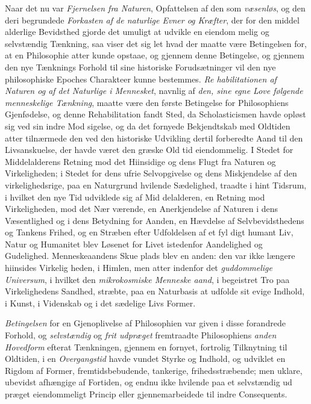 Naar det nu var \emph{Fjernelsen fra Naturen}, Opfattelsen
af den som \emph{væsenløs}, og den deri begrundede \emph{Forkasten
af de naturlige Evner og Kræfter}, der for den middel\-%
alderlige Bevidsthed gjorde det umuligt at udvikle en eiendom\-%
melig og selvstændig Tænkning, saa viser det sig let hvad der
maatte være Betingelsen for, at en Philosophie atter kunde
opstaae, og gjennem denne Betingelse, og gjennem den nye
Tænknings Forhold til sine historiske Forudsætninger vil den
nye philosophiske Epoches Charakteer kunne bestemmes. \emph{Re\-%
habilitationen af Naturen og af det Naturlige i
Mennesket}, navnlig af \emph{den, sine egne Love følgende
menneskelige Tænkning}, maatte være den første Betingelse
for Philosophiens Gjenfødelse, og denne Rehabilitation fandt
Sted, da Scholasticismen havde opløst sig ved sin indre Mod\-%
sigelse, og da det fornyede Bekjendtskab med Oldtiden atter
tilnærmede den ved den historiske Udvikling dertil forberedte
Aand til den Livsanskuelse, der havde været den græske Old\-%
tid eiendommelig. I Stedet for Middelalderens Retning mod
 det Hiinsidige og dens Flugt fra Naturen og Virkeligheden; i
Stedet for dens ufrie Selvopgivelse og dens Miskjendelse af den
virkelighedsrige, paa en Naturgrund hvilende Sædelighed, traadte
i hint Tidsrum, i hvilket den nye Tid udviklede sig af Mid\-%
delalderen, en Retning mod Virkeligheden, mod det Nær\-%
værende, en Anerkjendelse af Naturen i dens Væsentlighed og
i dens Betydning for Aanden, en Hævdelse af Selvbevidsthedens
og Tankens Frihed, og en Stræben efter Udfoldelsen af et fyl\-%
digt humant Liv, Natur og Humanitet blev Løsenet for Livet
istedenfor Aandelighed og Gudelighed. Menneskeaandens Skue\-%
plads blev en anden: den var ikke længere hiinsides Virkelig\-%
heden, i Himlen, men atter indenfor det \emph{guddommelige
Universum}, i hvilket den \emph{mikrokosmiske Menneske\-%
aand}, i begeistret Tro paa Virkelighedens Sandhed, stræbte,
paa en Naturbasis at udfolde sit evige Indhold, i Kunst, i
Videnskab og i det sædelige Livs Former.

\emph{Betingelsen} for en Gjenoplivelse af Philosophien var
given i disse forandrede Forhold, og \emph{selvstændig} og \emph{frit
udpræget} fremtraadte Philosophiens \emph{anden Hovedform}
efterat Tænkningen, gjennem en fornyet, fortrolig Tilknytning
til Oldtiden, i en \emph{Overgangstid} havde vundet Styrke og
Indhold, og udviklet en Rigdom af Former, fremtidsbebudende,
tankerige, frihedsstræbende; men uklare, ubevidst afhængige
af Fortiden, og endnu ikke hvilende paa et selvstændig ud\-%
præget eiendommeligt Princip eller gjennemarbeidede til indre
Consequents.

